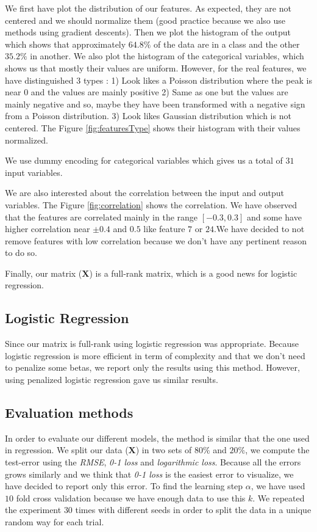 \documentclass{article} %
\begin{document}
We first have plot the distribution of our features. As expected, they are not centered and we should normalize them (good practice because we also use methods using gradient descents). Then we plot the histogram of the output which shows that approximately $64.8\%$ of the data are in a class and the other $35.2\%$ in another. We also plot the histogram of the categorical variables, which shows us that mostly their values are uniform. However, for the real features, we have distinguished 3 types : 1) Look likes a Poisson distribution where the peak is near 0 and the values are mainly positive 2) Same as one but the values are mainly negative and so, maybe they have been transformed with a negative sign from a Poisson distribution. 3) Look likes Gaussian distribution which is not centered. The Figure \ref{fig:featuresType} shows their histogram with their values normalized.

We use dummy encoding for categorical variables which gives us a total of $31$ input variables.

We are also interested about the correlation between the input and output variables. The Figure \ref{fig:correlation} shows the correlation. We have observed that the features are correlated mainly in the range $[-0.3,0.3]$ and some have higher correlation near $\pm0.4$ and $0.5$ like feature $7$ or $24$.We have decided to not remove features with low correlation because we don't have any pertinent reason to do so.

Finally, our matrix ($\mathbf{X}$) is a full-rank matrix, which is a good news for logistic regression.

\subsection{Logistic Regression}

Since our matrix is full-rank using logistic regression was appropriate. Because logistic regression is more efficient in term of complexity and that we don't need to penalize some betas, we report only the results using this method. However, using penalized logistic regression gave us similar results.

\subsection{Evaluation methods}

In order to evaluate our different models, the method is similar that the one used in regression. We split our data ($\mathbf{X}$) in two sets of $80\%$ and $20\%$, we compute the test-error using the \textit{RMSE}, \textit{0-1 loss} and \textit{logarithmic loss}. Because all the errors grows similarly and we think that \textit{0-1 loss} is the easiest error to visualize, we have decided to report only this error. To find the learning step $\alpha$, we have used $10$ fold cross validation because we have enough data to use this $k$. We repeated the experiment $30$ times with different seeds in order to split the data in a unique random way for each trial.
\end{document}
